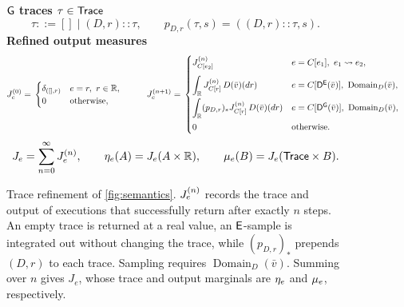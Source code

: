 \begin{figure}[t]
\centering
\footnotesize
\textbf{$\G$ traces $\tau\in\Trace$}
\[
 \tau ::= []\mid(D,r)::\tau,
 \qquad
 p_{D,r}(\tau,s)=((D,r)::\tau,s).
\]
\textbf{Refined output measures}
\[
\begin{aligned}
 \joint e0
 &={}
 \begin{cases}
   \delta_{([],r)} & e=r,\ r\in\Real,\\
   0 & \text{otherwise},
 \end{cases}
 &\qquad
 \joint e{n+1}
 &={}
 \begin{cases}
   \joint{C[e_2]}n
     & e=C[e_1],\ e_1\rightsquigarrow e_2,\\[8pt]
   \displaystyle\int_{\Real}\joint{C[r]}n\,D(\bar v)(dr)
     & e=C[\draw D\E{\bar v}],\ \operatorname{Domain}_D(\bar v),\\[8pt]
   \displaystyle\int_{\Real}(p_{D,r})_*\joint{C[r]}n\,D(\bar v)(dr)
     & e=C[\draw D\G{\bar v}],\ \operatorname{Domain}_D(\bar v),\\[8pt]
   0 & \text{otherwise}.
 \end{cases}
\end{aligned}
\]
\[
 J_e=\sum_{n=0}^{\infty}\joint e n,
 \qquad
 \trlaw e(A)=J_e(A\times\Real)\leanref{trace-law},
 \qquad
 \law e(B)=J_e(\Trace\times B)\leanref{trace-erasure}.
\]
\caption{Trace refinement of \cref{fig:semantics}.
$\joint e n$ records the trace and output of executions that successfully return after exactly
$n$ steps. An empty trace is returned at a real value, an $\E$-sample is integrated out without changing the trace, while $(p_{D,r})_*$ prepends $(D,r)$ to each trace.
Sampling requires $\operatorname{Domain}_D(\bar v)$. Summing over $n$ gives $J_e$, whose trace and output
marginals are $\trlaw e$ and $\law e$, respectively.}
\label{fig:traces}
\end{figure}

